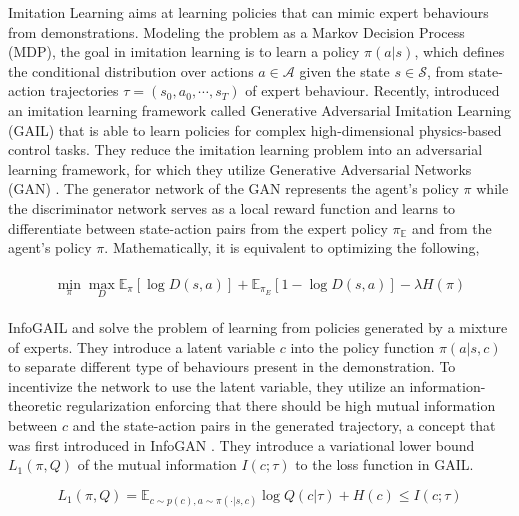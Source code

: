 \documentclass{article} %
\begin{document}
Imitation Learning \citep{pomerleau1989alvinn} aims at learning policies that can mimic expert behaviours from demonstrations. Modeling the problem as a Markov Decision Process (MDP), the goal in imitation learning is to learn a policy $\pi(a|s)$, which defines the conditional distribution over actions $a \in \mathcal{A} $ given the state $s \in \mathcal{S}$, from state-action trajectories $\tau = (s_{0}, a_{0}, \cdots , s_{T})$ of expert behaviour. Recently, \cite{ho2016generative} introduced an imitation learning framework called Generative Adversarial Imitation Learning (GAIL) that is able to learn policies for complex high-dimensional physics-based control tasks. They reduce the imitation learning problem into an adversarial learning framework, for which they utilize Generative Adversarial Networks (GAN) \citep{goodfellow2014generative}. The generator network of the GAN represents the agent's policy $\pi$ while the discriminator network serves as a local reward function and learns to differentiate between state-action pairs from the expert policy $\pi_{\mathbb{E}}$ and from the agent's policy $\pi$. Mathematically, it is equivalent to optimizing the following,

\begin{align*}\label{eq:gail_2}
\begin{split}
    \min_{\pi} \max_{D} \mathbb{E}_{\pi} [\log D(s,a)] + \mathbb{E}_{\pi_E} [1-\log D(s,a)] -\lambda H(\pi)
\end{split}
\end{align*}

InfoGAIL \citep{li2017infogail} and \cite{hausman2017multi} solve the problem of learning from policies generated by a mixture of experts. They introduce a latent variable $c$ into the policy function $\pi(a|s, c)$ to separate different type of behaviours present in the demonstration. To incentivize the network to use the latent variable, they utilize an information-theoretic regularization enforcing that there should be high mutual information between $c$ and the state-action pairs in the generated trajectory, a concept that was first introduced in InfoGAN \citep{chen2016infogan}. They introduce a variational lower bound $L_1(\pi, Q)$ of the mutual information $I(c; \tau)$ to the loss function in GAIL.

\begin{equation*}
    L_1(\pi, Q) = \mathbb{E}_{c \sim p(c), a \sim \pi(\cdot | s, c)} \log Q(c|\tau) + H(c) \leq I(c; \tau)
\end{equation*}
\end{document}

